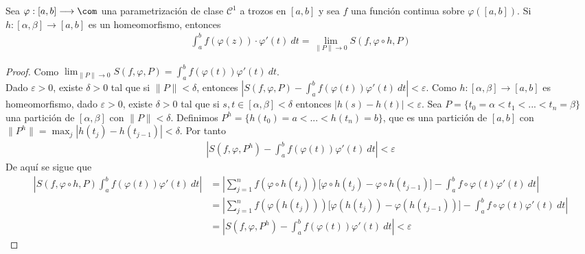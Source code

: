 \begin{lema}
Sea $\varphi : [a,b] \longrightarrow \com$ una parametrización de clase $\mathscr{C}^1$ a trozos en $[a,b]$ y sea $f$ una función continua sobre $\varphi([a,b])$. Si $h : [\alpha,\beta] \longrightarrow [a,b]$ es un homeomorfismo, entonces
\begin{align*}
    \int_{a}^{b}{f(\varphi(z))\cdot \varphi'(t) \ dt} = \lim_{\|P\| \to 0}{S(f,\varphi \circ h,P)}
\end{align*}
\end{lema}

\begin{proof}
Como $\lim_{\|P\| \to 0}{S(f,\varphi,P)} = \int_{a}^{b}{f(\varphi(t))\varphi'(t) \ dt}$. 
\\
\newline
Dado $\varepsilon > 0$, existe $\delta > 0$ tal que si $\|P\| < \delta$, entonces $\left|S(f,\varphi,P) - \int_{a}^{b}{f(\varphi(t))\varphi'(t) \ dt}\right| < \varepsilon$. Como $h : [\alpha,\beta] \longrightarrow [a,b]$ es homeomorfismo, dado $\varepsilon > 0$, existe $\delta > 0$ tal que si $s,t \in [\alpha,\beta] < \delta$ entonces $|h(s) - h(t)| < \varepsilon$. Sea $P = \{ t_0 = \alpha < t_1 < ... < t_n = \beta \}$ una partición de $[\alpha,\beta]$ con $\|P\| < \delta$. Definimos $P^h = \{h(t_0) = a < ... < h(t_n) = b \}$, que es una partición de $[a,b]$ con $\|P^h\| = \max_{j}{|h(t_j) - h(t_{j-1})|} < \delta$. Por tanto
\begin{align*}
    \left|S\left(f,\varphi,P^h\right) - \int_{a}^{b}{f(\varphi(t))\varphi'(t) \ dt}\right| < \varepsilon
\end{align*}
De aquí se sigue que
\begin{align*}
    \left|S(f,\varphi \circ h, P) \int_{a}^{b}{f(\varphi(t))\varphi'(t) \ dt}\right|
    &= \left| \sum_{j=1}^{n} f(\varphi \circ h(t_j))\Big[\varphi \circ h(t_j) - \varphi \circ h(t_{j-1})\Big] -\int_{a}^{b}{f \circ \varphi (t) \varphi'(t) \ dt} \right| \\
    &= \left| \sum_{j=1}^{n} f(\varphi( h(t_j)))\Big[\varphi( h(t_j)) - \varphi(h(t_{j-1}))\Big] -\int_{a}^{b}{f \circ \varphi (t) \varphi'(t) \ dt} \right| \\
    &= \left|S\left(f,\varphi,P^h\right) - \int_{a}^{b}{f(\varphi(t))\varphi'(t) \ dt}\right| < \varepsilon
\end{align*}
\end{proof}

